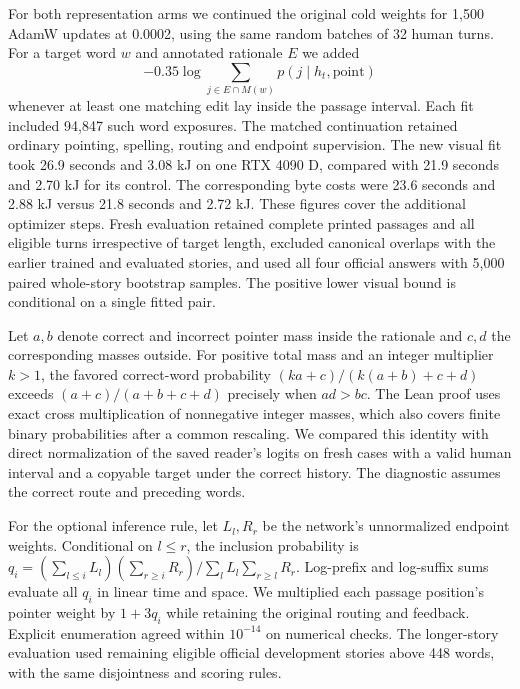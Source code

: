 \documentclass[12pt,a4paper]{article}
\providecommand{\DIFadd}[1]{{\protect\color{blue} \sf #1}} %
\begin{document}
\DIFadd{For both representation arms we continued the original cold weights for 1,500 AdamW updates at 0.0002, using the same random batches of 32 human turns. For a target word $w$ and annotated rationale $E$ we added
}\[
 -0.35\log\sum_{j\in E\cap M(w)}p(j\mid h_t,\mathrm{point})
\]
\DIFadd{whenever at least one matching edit lay inside the passage interval. Each fit included 94,847 such word exposures. The matched continuation retained ordinary pointing, spelling, routing and endpoint supervision. The new visual fit took 26.9 seconds and 3.08 kJ on one RTX 4090 D, compared with 21.9 seconds and 2.70 kJ for its control. The corresponding byte costs were 23.6 seconds and 2.88 kJ versus 21.8 seconds and 2.72 kJ. These figures cover the additional optimizer steps. Fresh evaluation retained complete printed passages and all eligible turns irrespective of target length, excluded canonical overlaps with the earlier trained and evaluated stories, and used all four official answers with 5,000 paired whole-story bootstrap samples. The positive lower visual bound is conditional on a single fitted pair.
}

\DIFadd{Let $a,b$ denote correct and incorrect pointer mass inside the rationale and $c,d$ the corresponding masses outside. For positive total mass and an integer multiplier $k>1$, the favored correct-word probability $(ka+c)/(k(a+b)+c+d)$ exceeds $(a+c)/(a+b+c+d)$ precisely when $ad>bc$. The Lean proof uses exact cross multiplication of nonnegative integer masses, which also covers finite binary probabilities after a common rescaling. We compared this identity with direct normalization of the saved reader's logits on fresh cases with a valid human interval and a copyable target under the correct history. The diagnostic assumes the correct route and preceding words.
}

\DIFadd{For the optional inference rule, let $L_l,R_r$ be the network's unnormalized endpoint weights. Conditional on $l\le r$, the inclusion probability is $q_i=(\sum_{l\le i}L_l)(\sum_{r\ge i}R_r)/\sum_l L_l\sum_{r\ge l}R_r$. Log-prefix and log-suffix sums evaluate all $q_i$ in linear time and space. We multiplied each passage position's pointer weight by $1+3q_i$ while retaining the original routing and feedback. Explicit enumeration agreed within $10^{-14}$ on numerical checks. The longer-story evaluation used remaining eligible official development stories above 448 words, with the same disjointness and scoring rules.
}
\end{document}
